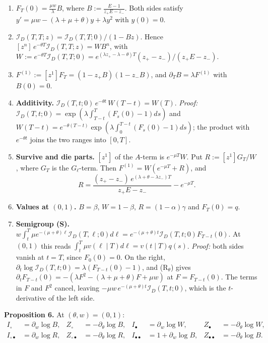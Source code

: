 \documentclass[10pt,]{article}
\begin{document}
\begin{enumerate}
\def\labelenumi{(\alph{enumi})}
\item
  \(F_T(0)=\frac{\mu w}{\lambda}B\), where \(B:=\frac{E-1}{z_+E-z_-}\).
  Both sides satisfy \(y'=\mu w-(\lambda+\mu+\theta)y+\lambda y^2\) with
  \(y(0)=0\).
\item
  \(\mathcal I_D(T,T;z)=\mathcal I_D(T,T;0)/(1-Bz)\). Hence
  \([z^n]\,e^{-\theta T}\mathcal I_D(T,T;z)=W B^n\), with
  \(W:=e^{-\theta T}\mathcal I_D(T,T;0)=e^{(\lambda z_+-\lambda-\theta)T}(z_+-z_-)/(z_+E-z_-)\).
\item
  \(F^{(1)}:=[z^1]F_T=(1-z_+B)(1-z_-B)\), and
  \(\partial_TB=\lambda F^{(1)}\) with \(B(0)=0\).
\item
  \textbf{Additivity.}
  \(\mathcal I_D(T,t;0)\,e^{-\theta t}\,W(T-t)=W(T)\). \emph{Proof:}
  \(\mathcal I_D(T,t;0)=\exp(\lambda\int_{T-t}^T(F_s(0)-1)ds)\) and
  \(W(T-t)=e^{-\theta(T-t)}\exp(\lambda\int_0^{T-t}(F_s(0)-1)ds)\); the
  product with \(e^{-\theta t}\) joins the two ranges into \([0,T]\).
\item
  \textbf{Survive and die parts.} \([z^1]\) of the \(A\)-term is
  \(e^{-\mu T}W\). Put \(R:=[z^1]G_T/W\), where \(G_T\) is the
  \(G_\ell\)-term. Then \(F^{(1)}=W(e^{-\mu T}+R)\), and
  \[R=\frac{(z_+-z_-)\,e^{(\lambda+\theta-\lambda z_-)T}}{z_+E-z_-}-e^{-\mu T}.\]
\item
  \textbf{Values at \((0,1)\).} \(B=\beta\), \(W=1-\beta\),
  \(R=(1-\alpha)\gamma\) and \(F_T(0)=q\).
\item
  \textbf{Semigroup (S).}
  \(w\int_t^T\mu e^{-(\mu+\theta)\ell}\mathcal I_D(T,\ell;0)d\ell=e^{-(\mu+\theta)t}\mathcal I_D(T,t;0)F_{T-t}(0)\).
  At \((0,1)\) this reads
  \(\int_t^T\mu v(\ell\mid T)d\ell=v(t\mid T)q(s)\). \emph{Proof:} both
  sides vanish at \(t=T\), since \(F_0(0)=0\). On the right,
  \(\partial_t\log\mathcal I_D(T,t;0)=\lambda(F_{T-t}(0)-1)\), and
  (R\(_\theta\)) gives
  \(\partial_tF_{T-t}(0)=-(\lambda F^2-(\lambda+\mu+\theta)F+\mu w)\) at
  \(F=F_{T-t}(0)\). The terms in \(F\) and \(F^2\) cancel, leaving
  \(-\mu w\,e^{-(\mu+\theta)t}\mathcal I_D(T,t;0)\), which is the
  \(t\)-derivative of the left side.
\end{enumerate}

\textbf{Proposition 6.} At \((\theta,w)=(0,1)\): \[\begin{aligned}
I_\circ&=\partial_w\log B, & Z_\circ&=-\partial_\theta\log B, &
I_\bullet&=\partial_w\log W, & Z_\bullet&=-\partial_\theta\log W,\\
I_{\circ\bullet}&=\partial_w\log R, & Z_{\circ\bullet}&=-\partial_\theta\log R, &
I_{\bullet\bullet}&=1+\partial_w\log B, & Z_{\bullet\bullet}&=-\partial_\theta\log B .
\end{aligned}\]
\end{document}
